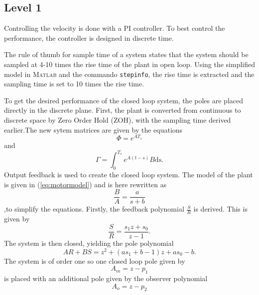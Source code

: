 \documentclass[12pt,a4paper]{article}
\begin{document}
\subsection*{Level 1}
\label{sub:velocity_level_1}
Controlling the velocity is done with a PI controller. To best control the
performance, the controller is designed in discrete time. \par
The rule of thumb for sample time of a system states that the system should be
sampled at 4-10 times the rise time of the plant in open loop. Using the
simplified model in \textsc{Matlab} and the commando \texttt{stepinfo}, the rise
time is extracted and the sampling time is set to 10 times the rise time. \par
To get the desired performance of the closed loop system, the poles are placed
directly in the discrete plane. First, the plant is converted from continuous to
discrete space by Zero Order Hold (ZOH), with the sampling time derived
earlier.The new sytem matrices are given by the equations
\begin{equation}
    \label{eq:phi}
    \Phi = e^{AT_s}
\end{equation}
and 
\begin{equation}
    \label{eq:gamma}
    \Gamma = \int_0^{T_s}{e^{A(t-s)}B\text{ds}}.
\end{equation}
Output feedback is used to create the closed loop system. 
The model of the plant is given in (\ref{eq:motormodel}) and is here rewritten as
\begin{equation}
    \label{eq:motorsimple}
    \frac{B}{A}=\frac{a}{s + b}
\end{equation}
,to simplify the equations. 
Firstly, the feedback polynomial $\frac{S}{R}$ is derived. This is given by
\begin{equation}
    \label{eq:feedback_vel}
    \frac{S}{R}=\frac{s_1z + s_0}{z - 1}.
\end{equation}
The system is then closed, yielding the pole polynomial
\begin{equation}
    \label{eq:polepolynomial_vel}
    AR + BS = z^2+(as_1+b-1)z+as_0-b.
\end{equation}
The system is of order one so one closed loop pole given by 
\begin{equation}
    \label{eq:am_vel}
    A_m = z - p_1
\end{equation}
is placed with an additional pole given by the observer polynomial 
\begin{equation}
    \label{eq:ao_vel}
    A_o = z - p_2
\end{equation}
\end{document}
